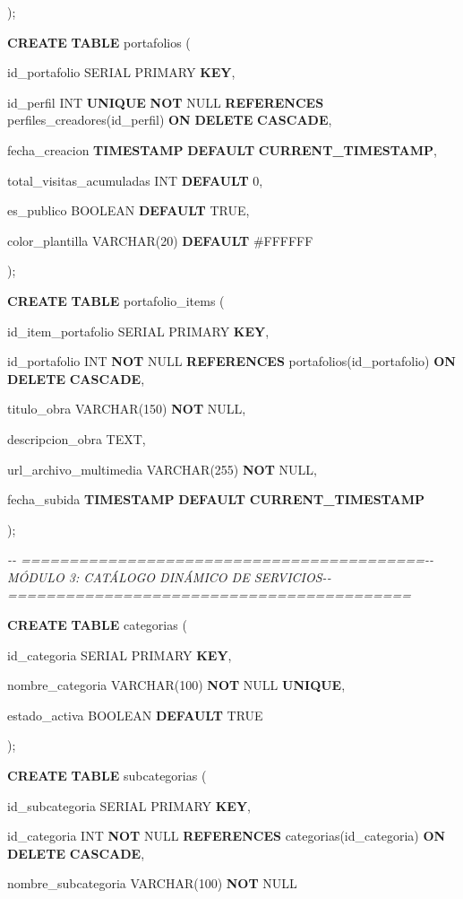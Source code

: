 \documentclass[
]{article}
\begin{document}
);

\textbf{CREATE} \textbf{TABLE} portafolios (

id\_portafolio SERIAL PRIMARY \textbf{KEY},

id\_perfil INT \textbf{UNIQUE} \textbf{NOT} NULL \textbf{REFERENCES}
perfiles\_creadores(id\_perfil) \textbf{ON} \textbf{DELETE}
\textbf{CASCADE},

fecha\_creacion \textbf{TIMESTAMP} \textbf{DEFAULT}
\textbf{CURRENT\_TIMESTAMP},

total\_visitas\_acumuladas INT \textbf{DEFAULT} 0,

es\_publico BOOLEAN \textbf{DEFAULT} TRUE,

color\_plantilla VARCHAR(20) \textbf{DEFAULT}
\textquotesingle\#FFFFFF\textquotesingle{}

);

\textbf{CREATE} \textbf{TABLE} portafolio\_items (

id\_item\_portafolio SERIAL PRIMARY \textbf{KEY},

id\_portafolio INT \textbf{NOT} NULL \textbf{REFERENCES}
portafolios(id\_portafolio) \textbf{ON} \textbf{DELETE}
\textbf{CASCADE},

titulo\_obra VARCHAR(150) \textbf{NOT} NULL,

descripcion\_obra TEXT,

url\_archivo\_multimedia VARCHAR(255) \textbf{NOT} NULL,

fecha\_subida \textbf{TIMESTAMP} \textbf{DEFAULT}
\textbf{CURRENT\_TIMESTAMP}

);

\emph{-\/- ==========================================-\/- MÓDULO 3:
CATÁLOGO DINÁMICO DE SERVICIOS-\/-
==========================================}

\textbf{CREATE} \textbf{TABLE} categorias (

id\_categoria SERIAL PRIMARY \textbf{KEY},

nombre\_categoria VARCHAR(100) \textbf{NOT} NULL \textbf{UNIQUE},

estado\_activa BOOLEAN \textbf{DEFAULT} TRUE

);

\textbf{CREATE} \textbf{TABLE} subcategorias (

id\_subcategoria SERIAL PRIMARY \textbf{KEY},

id\_categoria INT \textbf{NOT} NULL \textbf{REFERENCES}
categorias(id\_categoria) \textbf{ON} \textbf{DELETE} \textbf{CASCADE},

nombre\_subcategoria VARCHAR(100) \textbf{NOT} NULL
\end{document}
